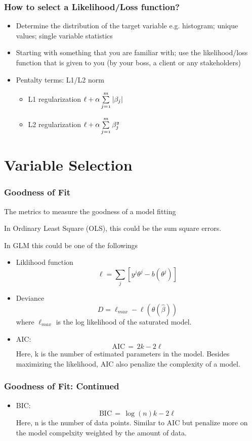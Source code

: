 \documentclass[notheorems, aspectratio=54, tikz,border=10pt,multi]{beamer}
\begin{document}
\begin{frame}
\frametitle{How to select a Likelihood/Loss function?}
\begin{itemize}
\item Determine the distribution of the target variable e.g. histogram; unique values; single variable statistics
\item Starting with something that you are familiar with; use the likelihood/loss function that is given to you (by your boss, a client or any stakeholders)
\item Pentalty terms: L1/L2 norm 
\begin{itemize}
\item L1 regularization $\mathnormal{\ell+\alpha \sum\limits_{j=1}^m|\beta_j|}$
\item L2 regularization $\mathnormal{\ell+\alpha \sum\limits_{j=1}^m\beta_j^2}$
\end{itemize}


\end{itemize}
\end{frame}

\section{Variable Selection}

\begin{frame}
\frametitle{Goodness of Fit}

The metrics to measure the goodness of a model fitting

In Ordinary Least Square (OLS), this could be the sum square errors.

In GLM this could be one of the followings
\begin{itemize}
\item Liklihood function$$\ell=\sum_{j} \left[y^j\theta^j-b(\theta^j)\right]$$

\item Deviance $$D=\ell_{max}-\ell(\theta (\hat{\beta}))$$ where $\ell_{max}$ is the log likelihood of the saturated model.

\item AIC: $${\displaystyle \mathrm {AIC} \,=\,2k-2\ell}$$
Here, k is the number of estimated parameters in the model. Besides maximizing the likelihood, AIC also penalize the complexity of a model.

\end{itemize}
\end{frame}

\begin{frame}
\frametitle{Goodness of Fit: Continued}
\begin{itemize}
\item BIC: $${\displaystyle \mathrm {BIC} \,=\,\log(n)k-2{\ell}}$$
Here, n is the number of data points. Similar to AIC but penalize more on the model compelxity weighted by the amount of data.
\end{itemize}
\end{frame}
\end{document}
